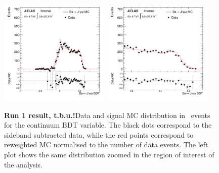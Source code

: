 %
\begin{figure}[!b]
\begin{center}
\hspace*{-0.4cm}
\includegraphics[width=0.47\textwidth]{figures/InternalNote_DataMCComparison/compRun1/Bs/BsJpsiphi_BDT12.pdf}
\hspace*{-0.4cm}
\includegraphics[width=0.47\textwidth]{figures/InternalNote_DataMCComparison/compRun1/Bs/BsJpsiphi_BDT12zoomed.pdf}
\caption{\textbf{Run 1 result, t.b.u.!}Data and signal MC distribution in \BsJpsiPhi\ events for the
continuum BDT variable.
The black dots correspond to the sideband subtracted data, while 
the red points correspond to reweighted MC normalised to the number
of data events. The left plot shows the same distribution zoomed
in the region of interest of the analysis.}
\label{fig:jpsiphiBDT}
\end{center}
\end{figure}
%
 
